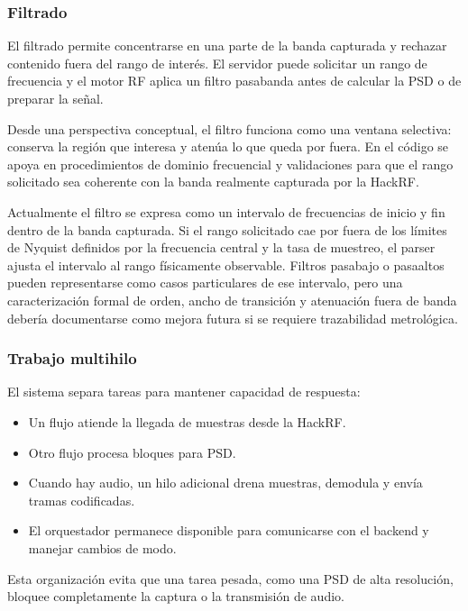 \subsubsection{Filtrado}

El filtrado permite concentrarse en una parte de la banda capturada y rechazar
contenido fuera del rango de interés. El servidor puede solicitar un rango de
frecuencia y el motor RF aplica un filtro pasabanda antes de calcular la PSD o de
preparar la señal.

Desde una perspectiva conceptual, el filtro funciona como una ventana selectiva:
conserva la región que interesa y atenúa lo que queda por fuera. En el código se
apoya en procedimientos de dominio frecuencial y validaciones para que el rango
solicitado sea coherente con la banda realmente capturada por la HackRF.

Actualmente el filtro se expresa como un intervalo de frecuencias de inicio y fin
dentro de la banda capturada. Si el rango solicitado cae por fuera de los límites
de Nyquist definidos por la frecuencia central y la tasa de muestreo, el parser
ajusta el intervalo al rango físicamente observable. Filtros pasabajo o pasaaltos
pueden representarse como casos particulares de ese intervalo, pero una
caracterización formal de orden, ancho de transición y atenuación fuera de banda
debería documentarse como mejora futura si se requiere trazabilidad metrológica.

\subsubsection{Trabajo multihilo}

El sistema separa tareas para mantener capacidad de respuesta:

\begin{itemize}
  \item Un flujo atiende la llegada de muestras desde la HackRF.
  \item Otro flujo procesa bloques para PSD.
  \item Cuando hay audio, un hilo adicional drena muestras, demodula y envía
  tramas codificadas.
  \item El orquestador permanece disponible para comunicarse con el backend y
  manejar cambios de modo.
\end{itemize}

Esta organización evita que una tarea pesada, como una PSD de alta resolución,
bloquee completamente la captura o la transmisión de audio.

